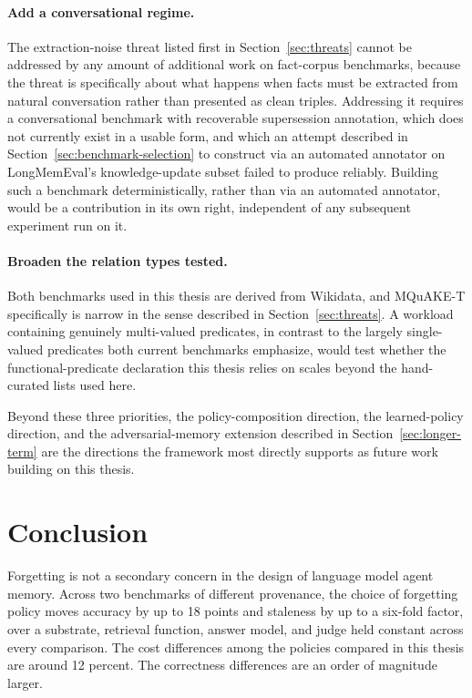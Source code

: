 \paragraph{Add a conversational regime.} The extraction-noise threat listed first in Section~\ref{sec:threats} cannot be addressed by any amount of additional work on fact-corpus benchmarks, because the threat is specifically about what happens when facts must be extracted from natural conversation rather than presented as clean triples. Addressing it requires a conversational benchmark with recoverable supersession annotation, which does not currently exist in a usable form, and which an attempt described in Section~\ref{sec:benchmark-selection} to construct via an automated annotator on LongMemEval's knowledge-update subset failed to produce reliably. Building such a benchmark deterministically, rather than via an automated annotator, would be a contribution in its own right, independent of any subsequent experiment run on it.

\paragraph{Broaden the relation types tested.} Both benchmarks used in this thesis are derived from Wikidata, and MQuAKE-T specifically is narrow in the sense described in Section~\ref{sec:threats}. A workload containing genuinely multi-valued predicates, in contrast to the largely single-valued predicates both current benchmarks emphasize, would test whether the functional-predicate declaration this thesis relies on scales beyond the hand-curated lists used here.

Beyond these three priorities, the policy-composition direction, the learned-policy direction, and the adversarial-memory extension described in Section~\ref{sec:longer-term} are the directions the framework most directly supports as future work building on this thesis.

\section{Conclusion}
\label{sec:conclusion}

Forgetting is not a secondary concern in the design of language model agent memory. Across two benchmarks of different provenance, the choice of forgetting policy moves accuracy by up to 18 points and staleness by up to a six-fold factor, over a substrate, retrieval function, answer model, and judge held constant across every comparison. The cost differences among the policies compared in this thesis are around 12 percent. The correctness differences are an order of magnitude larger.


